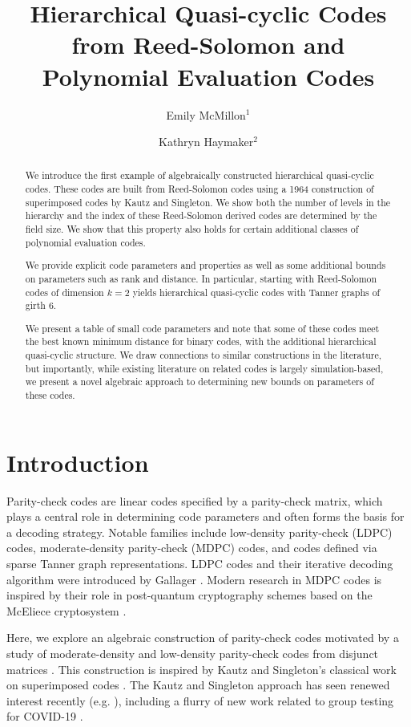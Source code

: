 \documentclass[11pt]{amsart}
\title{Hierarchical Quasi-cyclic Codes from Reed-Solomon and Polynomial Evaluation Codes}
\author{Emily McMillon$^1$}
\author{Kathryn Haymaker$^2$}
\theoremstyle{definition}
\newcommand{\0}{\mathbf{0}}
\begin{document}
\begin{abstract} 
    We introduce the first example of algebraically constructed hierarchical quasi-cyclic codes. These codes are built from Reed-Solomon codes using a 1964 construction of superimposed codes by Kautz and Singleton. We show both the number of levels in the hierarchy and the index of these Reed-Solomon derived codes are determined by the field size. We show that this property also holds for certain additional classes of polynomial evaluation codes.
    
    We provide explicit code parameters and properties as well as some additional bounds on parameters such as rank and distance. In particular, starting with Reed-Solomon codes of dimension $k=2$ yields hierarchical quasi-cyclic codes with Tanner graphs of girth $6$.

    We present a table of small code parameters and note that some of these codes meet the best known minimum distance for binary codes, with the additional hierarchical quasi-cyclic structure. We draw connections to similar constructions in the literature, but importantly, while existing literature on related codes is largely simulation-based, we present a novel algebraic approach to determining new bounds on parameters of these codes.
\end{abstract}

\maketitle

\section{Introduction} \label{sec:intro}

Parity-check codes are linear codes specified by a parity-check matrix, which plays a central role in determining code parameters and often forms the basis for a decoding strategy. Notable families include low-density parity-check (LDPC) codes, moderate-density parity-check (MDPC) codes, and codes defined via sparse Tanner graph representations. LDPC codes and their iterative decoding algorithm were introduced by Gallager \cite{gallager1960}. Modern research in MDPC codes is inspired by their role in post-quantum cryptography schemes based on the McEliece cryptosystem \cite{misoczki2013mdpc}.

Here, we explore an algebraic construction of parity-check codes motivated by a study of moderate-density and low-density parity-check codes from disjunct matrices \cite{haymaker2025parity}. This construction is inspired by Kautz and Singleton's classical work on superimposed codes \cite{kautz1964nonrandom}. The Kautz and Singleton approach  has seen renewed interest recently (e.g. \cite{inan2019optimality, essential20}), including a flurry of new work related to group testing for COVID-19 \cite{shental2020efficient, lau2021construction,haymaker2025pooled, dinesen2025group}.
\end{document}
